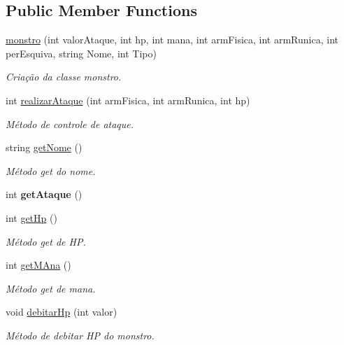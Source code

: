 \subsection*{Public Member Functions}
\begin{DoxyCompactItemize}
\item 
\mbox{\hyperlink{classmonstro_a0c7be686f5717cb625a3dabb75f6143f}{monstro}} (int valor\+Ataque, int hp, int mana, int arm\+Fisica, int arm\+Runica, int per\+Esquiva, string Nome, int Tipo)
\begin{DoxyCompactList}\small\item\em Criação da classe monstro. \end{DoxyCompactList}\item 
int \mbox{\hyperlink{classmonstro_a37425b0ce131bea83207142ef6b6c3bd}{realizar\+Ataque}} (int arm\+Fisica, int arm\+Runica, int hp)
\begin{DoxyCompactList}\small\item\em Método de controle de ataque. \end{DoxyCompactList}\item 
string \mbox{\hyperlink{classmonstro_a5b70fbe99ed64823246664deec8d4d6c}{get\+Nome}} ()
\begin{DoxyCompactList}\small\item\em Método get do nome. \end{DoxyCompactList}\item 
\mbox{\label{classmonstro_a4855556c86824869d11cc9f4bda17beb}} 
int {\bfseries get\+Ataque} ()
\item 
int \mbox{\hyperlink{classmonstro_a5fbec06d53697ed81f0ca64136f7eb85}{get\+Hp}} ()
\begin{DoxyCompactList}\small\item\em Método get de HP. \end{DoxyCompactList}\item 
int \mbox{\hyperlink{classmonstro_abf4c7159c0370eef7ee5c1992f475746}{get\+M\+Ana}} ()
\begin{DoxyCompactList}\small\item\em Método get de mana. \end{DoxyCompactList}\item 
void \mbox{\hyperlink{classmonstro_a2753a130e042a12b9a5be36cb01deba5}{debitar\+Hp}} (int valor)
\begin{DoxyCompactList}\small\item\em Método de debitar HP do monstro. \end{DoxyCompactList}\item 

\end{DoxyCompactItemize}
